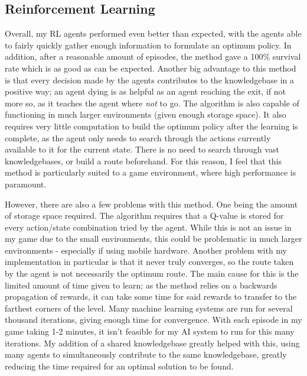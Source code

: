 \documentclass[a4paper,oneside]{report}
\begin{document}
\subsection{Reinforcement Learning}

Overall, my RL agents performed even better than expected, with the agents able to fairly quickly gather enough information to formulate an optimum policy. In addition, after a reasonable amount of episodes, the method gave a 100\% survival rate which is as good as can be expected. Another big advantage to this method is that every decision made by the agents contributes to the knowledgebase in a positive way; an agent dying is as helpful as an agent reaching the exit, if not more so, as it teaches the agent where \emph{not} to go. The algorithm is also capable of functioning in much larger environments (given enough storage space). It also requires very little computation to build the optimum policy after the learning is complete, as the agent only needs to search through the actions currently available to it for the current state. There is no need to search through vast knowledgebases, or build a route beforehand. For this reason, I feel that this method is particularly suited to a game environment, where high performance is paramount.

However, there are also a few problems with this method. One being the amount of storage space required. The algorithm requires that a Q-value is stored for every action/state combination tried by the agent. While this is not an issue in my game due to the small environments, this could be problematic in much larger environments - especially if using mobile hardware. Another problem with my implementation in particular is that it never truly converges, so the route taken by the agent is not necessarily the optimum route. The main cause for this is the limited amount of time given to learn; as the method relies on a backwards propagation of rewards, it can take some time for said rewards to transfer to the farthest corners of the level. Many machine learning systems are run for several thousand iterations, giving enough time for convergence. With each episode in my game taking 1-2 minutes, it isn't feasible for my AI system to run for this many iterations. My addition of a shared knowledgebase greatly helped with this, using many agents to simultaneously contribute to the same knowledgebase, greatly reducing the time required for an optimal solution to be found. 
\end{document}
